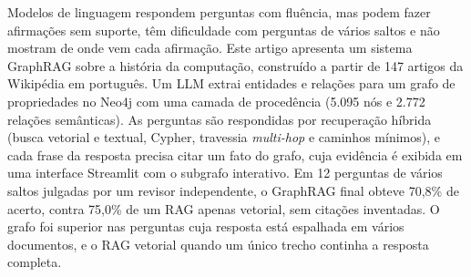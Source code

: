 %

\begin{abstract}
Large language models answer questions fluently, but they may state unsupported facts, struggle with multi-hop questions and do not show where each claim comes from. This paper presents a GraphRAG system on the history of computing, built from 147 Portuguese Wikipedia articles. An LLM extracts entities and relations into a Neo4j labeled property graph with a provenance layer (5,095 nodes, 2,772 semantic relations). Questions are answered by hybrid retrieval (vector and full-text search, Cypher, multi-hop traversal and shortest paths), and every sentence of the answer must cite a graph fact, whose source text is shown in a Streamlit interface with an interactive subgraph. On 12 multi-hop questions judged by an independent LLM reviewer, the final GraphRAG scored 70.8\% against 75.0\% for a vector-only RAG baseline, with no invented citations. The graph was better on questions whose answer spans several documents, and the baseline when a single passage held the full answer.
\end{abstract}

\begin{resumo}
Modelos de linguagem respondem perguntas com fluência, mas podem fazer afirmações sem suporte, têm dificuldade com perguntas de vários saltos e não mostram de onde vem cada afirmação. Este artigo apresenta um sistema GraphRAG sobre a história da computação, construído a partir de 147 artigos da Wikipédia em português. Um LLM extrai entidades e relações para um grafo de propriedades no Neo4j com uma camada de procedência (5.095 nós e 2.772 relações semânticas). As perguntas são respondidas por recuperação híbrida (busca vetorial e textual, Cypher, travessia \emph{multi-hop} e caminhos mínimos), e cada frase da resposta precisa citar um fato do grafo, cuja evidência é exibida em uma interface Streamlit com o subgrafo interativo. Em 12 perguntas de vários saltos julgadas por um revisor independente, o GraphRAG final obteve 70,8\% de acerto, contra 75,0\% de um RAG apenas vetorial, sem citações inventadas. O grafo foi superior nas perguntas cuja resposta está espalhada em vários documentos, e o RAG vetorial quando um único trecho continha a resposta completa.
\end{resumo}
